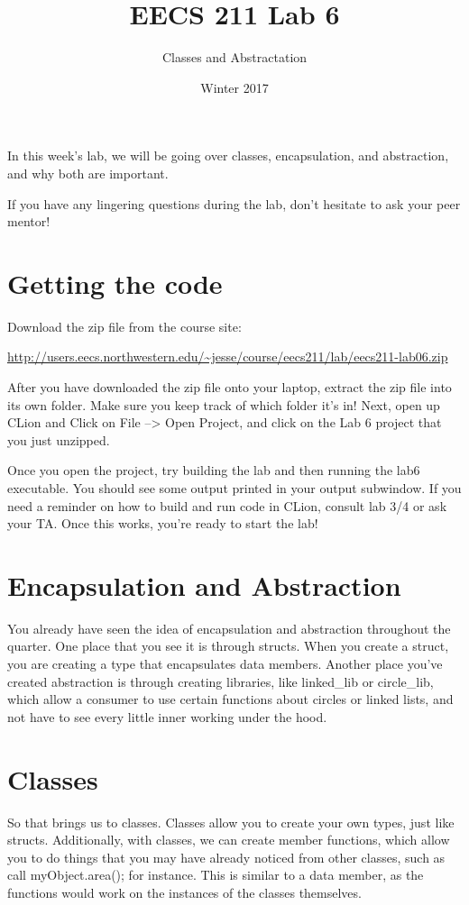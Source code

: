 \documentclass{tufte-handout}
\title{EECS 211 Lab 6}
\author{Classes and Abstractation}
\date{Winter 2017}
\begin{document}
\maketitle

In this week's lab, we will be going over classes, encapsulation, and abstraction, and why both are important.

If you have any lingering questions during the lab, don't hesitate to ask your peer mentor!
\section{Getting the code}
Download the zip file from the course site: \medskip

\url{http://users.eecs.northwestern.edu/~jesse/course/eecs211/lab/eecs211-lab06.zip}

\medskip \noindent
After you have downloaded the zip file onto your laptop, extract the zip file into its own folder. Make sure you keep track of which folder it's in!  Next, open up CLion and Click on File --> Open Project, and click on the Lab 6 project that you just unzipped. 

Once you open the project, try building the lab and then running the lab6 executable. 
You should see some output printed in your output subwindow.
If you need a reminder on how to build and run code in CLion, consult lab 3/4 or ask your TA.
Once this works, you're ready to start the lab!

\section{Encapsulation and Abstraction}
You already have seen the idea of encapsulation and abstraction throughout the quarter.
One place that you see it is through structs.
When you create a struct, you are creating a type that encapsulates data members.
Another place you've created abstraction is through creating libraries, like linked\_lib or circle\_lib, which allow a consumer to use certain functions about circles or linked lists, and not have to see every little inner working under the hood.

\section{Classes}
So that brings us to classes.  
Classes allow you to create your own types, just like structs.
Additionally, with classes, we can create member functions, which allow you to do things that you may have already noticed from other classes, such as call myObject.area(); for instance.
This is similar to a data member, as the functions would work on the instances of the classes themselves.  
\end{document}
